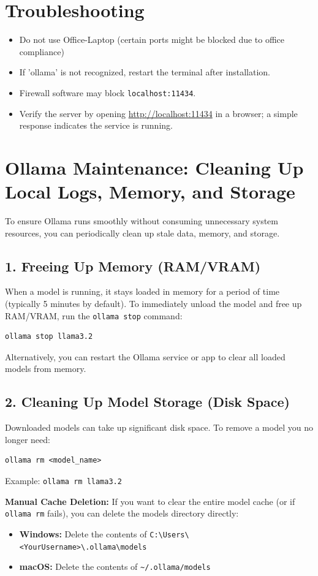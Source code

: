 \documentclass{article}
\begin{document}
\section*{Troubleshooting}
\begin{itemize}
    \item Do not use Office-Laptop (certain ports might be blocked due to office compliance)
    \item If 'ollama' is not recognized, restart the terminal after installation.
    \item Firewall software may block \texttt{localhost:11434}.
    \item Verify the server by opening \url{http://localhost:11434} in a browser; a simple response indicates the service is running.
\end{itemize}

\section*{Ollama Maintenance: Cleaning Up Local Logs, Memory, and Storage}

To ensure Ollama runs smoothly without consuming unnecessary system resources, you can periodically clean up stale data, memory, and storage.

\subsection*{1. Freeing Up Memory (RAM/VRAM)}
When a model is running, it stays loaded in memory for a period of time (typically 5 minutes by default). To immediately unload the model and free up RAM/VRAM, run the \texttt{ollama stop} command:
\begin{verbatim}
ollama stop llama3.2
\end{verbatim}
Alternatively, you can restart the Ollama service or app to clear all loaded models from memory.

\subsection*{2. Cleaning Up Model Storage (Disk Space)}
Downloaded models can take up significant disk space. To remove a model you no longer need:
\begin{verbatim}
ollama rm <model_name>
\end{verbatim}
Example: \texttt{ollama rm llama3.2}

\vspace{0.5em}
\noindent\textbf{Manual Cache Deletion:}
If you want to clear the entire model cache (or if \texttt{ollama rm} fails), you can delete the models directory directly:
\begin{itemize}
    \item \textbf{Windows:} Delete the contents of \texttt{C:\textbackslash Users\textbackslash <YourUsername>\textbackslash .ollama\textbackslash models}
    \item \textbf{macOS:} Delete the contents of \texttt{\textasciitilde/.ollama/models}
\end{itemize}
\end{document}
